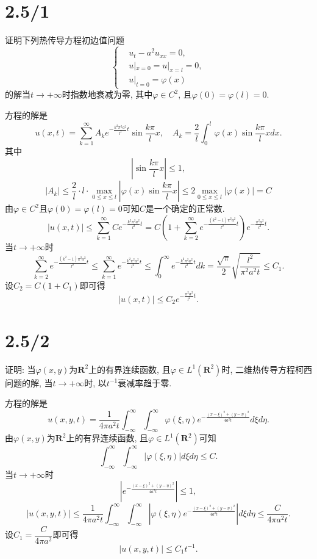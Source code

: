 \documentclass[11pt,a4paper]{article}
\author{刘逸灏 (515370910207)}
\begin{document}
\maketitle

\section{2.5/1}
\begin{problem}
证明下列热传导方程初边值问题
$$\left\{\begin{aligned}
     & u_t-a^2u_{xx}=0,     \\
     & u|_{x=0}=u|_{x=l}=0, \\
     & u|_{t=0}=\varphi(x)
  \end{aligned}\right.$$
的解当$t\to+\infty$时指数地衰减为零, 其中$\varphi\in C^2$, 且$\varphi(0)=\varphi(l)=0$.
\end{problem}

方程的解是
$$u(x,t)=\sum_{k=1}^\infty A_ke^{-\frac{k^2\pi^2a^2}{l^2}t}\sin\frac{k\pi}{l}x,\quad A_k=\frac{2}{l}\int_0^l\varphi(x)\sin\frac{k\pi}{l}xdx.$$
其中
$$\left|\sin\frac{k\pi}{l}x\right|\leqslant1,$$
$$|A_k|\leqslant\frac{2}{l}\cdot l\cdot\max_{0\leqslant x\leqslant l}\left|\varphi(x)\sin\frac{k\pi}{l}x\right|\leqslant 2\max_{0\leqslant x\leqslant l}|\varphi(x)|=C$$
由$\varphi\in C^2$且$\varphi(0)=\varphi(l)=0$可知$C$是一个确定的正常数.
$$|u(x,t)|\leqslant\sum_{k=1}^\infty Ce^{-\frac{k^2\pi^2a^2}{l^2}t}=C\left(1+\sum_{k=2}^\infty e^{-\frac{(k^2-1)\pi^2a^2}{l^2}t}\right)e^{-\frac{\pi^2a^2}{l^2}t}.$$
当$t\to+\infty$时
$$\sum_{k=2}^\infty e^{-\frac{(k^2-1)\pi^2a^2}{l^2}t}\leqslant \sum_{k=1}^\infty e^{-\frac{k^2\pi^2a^2}{l^2}t}\leqslant\int_0^\infty e^{-\frac{k^2\pi^2a^2}{l^2}t}dk=\frac{\sqrt{\pi}}{2}\sqrt{\frac{l^2}{\pi^2a^2t}}\leqslant C_1.$$
设$C_2=C(1+C_1)$即可得
$$|u(x,t)|\leqslant C_2e^{-\frac{\pi^2a^2}{l^2}t}.$$

\section{2.5/2}
\begin{problem}
证明: 当$\varphi(x,y)$为$\mathbf{R}^2$上的有界连续函数, 且$\varphi\in L^1(\mathbf{R}^2)$时, 二维热传导方程柯西问题的解, 当$t\to+\infty$时, 以$t^{-1}$衰减率趋于零.
\end{problem}

方程的解是
$$u(x,y,t)=\frac{1}{4\pi a^2t}\int_{-\infty}^\infty\int_{-\infty}^\infty\varphi(\xi,\eta)e^{-\frac{(x-\xi)^2+(y-\eta)^2}{4a^2t}}d\xi d\eta.$$
由$\varphi(x,y)$为$\mathbf{R}^2$上的有界连续函数, 且$\varphi\in L^1(\mathbf{R}^2)$可知
$$\int_{-\infty}^\infty\int_{-\infty}^\infty|\varphi(\xi,\eta)|d\xi d\eta\leqslant C.$$
当$t\to+\infty$时
$$\left|e^{-\frac{(x-\xi)^2+(y-\eta)^2}{4a^2t}}\right|\leqslant1,$$
$$|u(x,y,t)|\leqslant \frac{1}{4\pi a^2t}\int_{-\infty}^\infty\int_{-\infty}^\infty\left|\varphi(\xi,\eta)e^{-\frac{(x-\xi)^2+(y-\eta)^2}{4a^2t}}\right|d\xi d\eta\leqslant\frac{C}{4\pi a^2t}.$$
设$C_1=\dfrac{C}{4\pi a^2}$即可得
$$|u(x,y,t)|\leqslant C_1t^{-1}.$$
\end{document}
